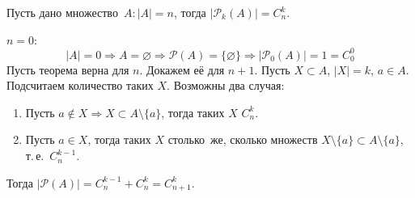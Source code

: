 \begin{theorem}
Пусть дано множество~$A \colon |A| = n$, тогда $|\mathcal P_k(A)| = C_n^k$.
\end{theorem}
\begin{proofmathind}
	\indbase $n = 0$:
	\begin{equation*}
	|A| = 0 \Rightarrow A = \varnothing \Rightarrow \mathcal P(A) = \{ \varnothing \} \Rightarrow
	|\mathcal P_0(A)| = 1 = C_0^0
	\end{equation*}
	\indstep Пусть теорема верна для $n$.
	Докажем её для $n + 1$.
	Пусть $X \subset A$, $|X| = k$, $a \in A$.
	Подсчитаем количество таких $X$.
	Возможны два случая:
	\begin{enumerate}
		\item Пусть $a \notin X \Rightarrow X \subset A \setminus \{ a \}$, тогда таких $X$ $C_n^k$.
		\item Пусть $a \in X$, тогда таких $X$ столько~же, сколько множеств
		$X \setminus \{ a \} \subset A \setminus \{ a \}$, т.\,е.~$C_n^{k-1}$.
	\end{enumerate}

	Тогда $|\mathcal P(A)| = C_n^{k-1} + C_n^k = C_{n+1}^k$. \indend
\end{proofmathind}